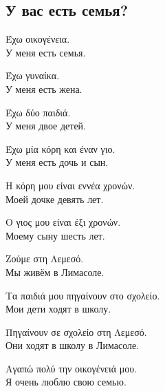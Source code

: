 \documentclass[12pt]{article}
\newcommand{\my}[1]{\textcolor{gray!80!white}{#1}}
\newenvironment{page}{\clearpage\normalsize\null\vfill}{\vfill\null}
\newenvironment{textblock}{\begin{minipage}{\textwidth}}{\end{minipage}\smallskip}
\begin{document}
	\begin{page}
		\subsection{У вас есть семья?}
		\small
		\begin{textblock}
			Έχω οικογένεια.\\
			\my{У меня есть семья.}
			
			Έχω γυναίκα.\\
			\my{У меня есть жена.}
			
			Έχω δύο παιδιά.\\
			\my{У меня двое детей.}
			
			Έχω μία κόρη και έναν γιο.\\
			\my{У меня есть дочь и сын.}
			
			Η κόρη μου είναι εννέα χρονών.\\
			\my{Моей дочке девять лет.}
			
			Ο γιος μου είναι έξι χρονών.\\
			\my{Моему сыну шесть лет.}
			
			Ζούμε στη Λεμεσό.\\
			\my{Мы живём в Лимасоле.}
			
			Τα παιδιά μου πηγαίνουν στο σχολείο.\\
			\my{Мои дети ходят в школу.}
			
			Πηγαίνουν σε σχολείο στη Λεμεσό.\\
			\my{Они ходят в школу в Лимасоле.}
			
			Αγαπώ πολύ την οικογένειά μου.\\
			\my{Я очень люблю свою семью.}
		\end{textblock}
	\end{page}
    
\end{document}
